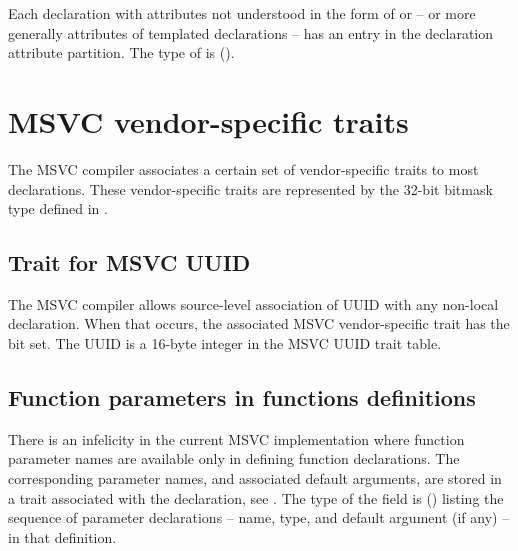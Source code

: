 Each declaration  with attributes not understood in the form of 
 or  -- or more generally attributes of templated declarations --
has an entry in the declaration attribute partition.  The type  of  is 
 ().



\section{MSVC vendor-specific traits}
\label{sec:ifc-msvc-vendor-specific-trait}

The MSVC compiler associates a certain set of vendor-specific traits to most declarations.  
These vendor-specific traits are represented by the 32-bit bitmask type 
defined in .



\subsection{Trait for MSVC UUID}
\label{sec:ifc-msvc-uuid-trait}

The MSVC compiler allows source-level association of UUID with any non-local declaration. When that occurs,
the associated MSVC vendor-specific trait has the  bit set.  The  UUID is a
16-byte integer in the MSVC UUID trait table.


\subsection{Function parameters in functions definitions}
\label{sec:ifc-msvc-fun-parms}

There is an infelicity in the current MSVC implementation where function parameter names are available only in defining function declarations.
The corresponding parameter names, and associated default arguments, are stored in a trait associated with the declaration, see .
The type of the  field
is  () listing the sequence of parameter declarations -- name, type, and default argument (if any) -- in that definition.


